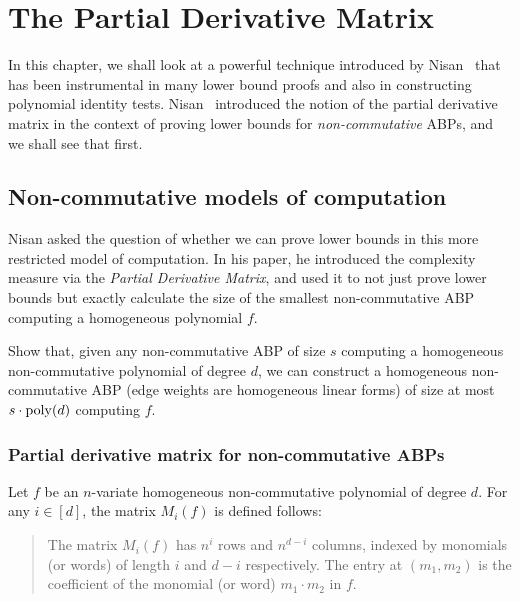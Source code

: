 \chapter{The Partial Derivative Matrix}\label{chap:evalDim}

In this chapter, we shall look at a powerful technique introduced by Nisan~\cite{nis91} that has been instrumental in many lower bound proofs and also in constructing polynomial identity tests.
Nisan~\cite{nis91} introduced the notion of the partial derivative matrix in the context of proving lower bounds for \emph{non-commutative} ABPs, and we shall see that first.

\section{Non-commutative models of computation}

Nisan \cite{nis91} asked the question of whether we can prove lower bounds in this more restricted model of computation. In his paper, he introduced the complexity measure via the \emph{Partial Derivative Matrix}, and used it to not just prove lower bounds but exactly calculate the size of the smallest non-commutative ABP computing a homogeneous polynomial $f$. \\

\begin{exercise}
Show that, given any non-commutative ABP of size $s$ computing a homogeneous non-commutative polynomial of degree $d$, we can construct a homogeneous non-commutative ABP (edge weights are homogeneous linear forms) of size at most $s \cdot \operatorname{poly}(d)$ computing $f$. 
\end{exercise}

\subsection{Partial derivative matrix for non-commutative ABPs}

\begin{definition} Let $f$ be an $n$-variate homogeneous non-commutative polynomial of degree $d$. For any $i \in [d]$, the matrix $M_i(f)$ is defined follows:
  \begin{quote}
    The matrix $M_i(f)$ has $n^i$ rows and $n^{d-i}$ columns, indexed by monomials (or words) of length $i$ and $d-i$ respectively. The entry at $(m_1, m_2)$ is the coefficient of the monomial (or word) $m_1 \cdot m_2$ in $f$. \qedhere
  \end{quote}
\end{definition}

